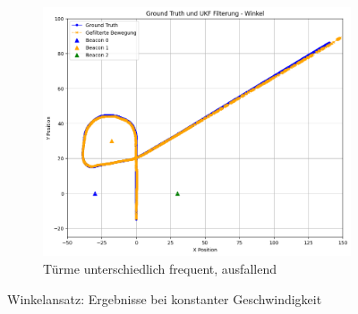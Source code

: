 \begin{figure}
\begin{subfigure}{.333\textwidth}
        \centering
        \includegraphics[width=.9\linewidth]{Ergebnisse/plots_fahrten/winkel/winkel_const_vel_flag_freq.png}
        \caption{Türme unterschiedlich frequent, ausfallend}
    \end{subfigure}
    \caption{Winkelansatz: Ergebnisse bei konstanter Geschwindigkeit}
\end{figure}